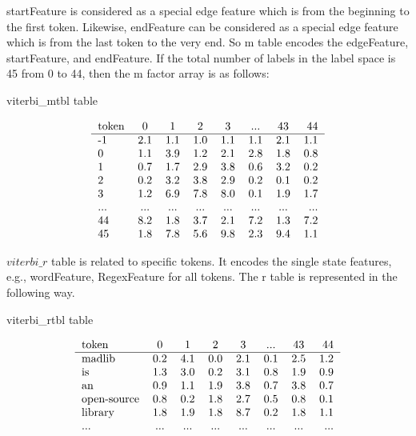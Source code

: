   startFeature is considered as a special edge feature which is from the
  beginning to the first token. Likewise, endFeature can be considered
  as a special edge feature which is from the last token to the very end.
  So m table encodes the edgeFeature, startFeature, and endFeature.
  If the total number of labels in the label space is 45 from 0 to 44,
  then the m factor array is as follows:
\begin {table}
\caption {viterbi\_mtbl table} \label{tab:title} 
 
  \[\begin{tabular}{l*{6}{c}r}
   token             & 0   & 1   & 2   & 3   & ... & 43 &  44 \\
   \hline
  -1                 & 2.1 & 1.1 & 1.0 & 1.1 & 1.1 & 2.1 & 1.1  \\
   0                 & 1.1 & 3.9 & 1.2 & 2.1 & 2.8 & 1.8 & 0.8  \\
   1                 & 0.7 & 1.7 & 2.9 & 3.8 & 0.6 & 3.2 & 0.2  \\
   2                 & 0.2 & 3.2 & 3.8 & 2.9 & 0.2 & 0.1 & 0.2  \\
   3                 & 1.2 & 6.9 & 7.8 & 8.0 & 0.1 & 1.9 & 1.7  \\
   ...               & ... & ... & ... & ... & ... & ... & ...  \\
   44                & 8.2 & 1.8 & 3.7 & 2.1 & 7.2 & 1.3 & 7.2  \\
   45                & 1.8 & 7.8 & 5.6 & 9.8 & 2.3 & 9.4 & 1.1  \\
  \end{tabular}\]
\end{table}
 
  $viterbi\_r$ table
  is related to specific tokens. It encodes the single state features,
  e.g., wordFeature, RegexFeature for all tokens. The r table is represented
  in the following way.\\
\begin {table}
\caption {viterbi\_rtbl table} \label{tab:title} 

  \[\begin{tabular}{l*{6}{c}r}
   token             & 0   & 1   & 2   & 3   & ... & 43 &  44 \\
   \hline
   madlib            & 0.2 & 4.1 & 0.0 & 2.1 & 0.1 & 2.5 & 1.2  \\
   is                & 1.3 & 3.0 & 0.2 & 3.1 & 0.8 & 1.9 & 0.9  \\
   an                & 0.9 & 1.1 & 1.9 & 3.8 & 0.7 & 3.8 & 0.7  \\
   open-source       & 0.8 & 0.2 & 1.8 & 2.7 & 0.5 & 0.8 & 0.1  \\
   library           & 1.8 & 1.9 & 1.8 & 8.7 & 0.2 & 1.8 & 1.1  \\
   ...               & ... & ... & ... & ... & ... & ... & ...  \\
  \end{tabular}\]
\end{table}

